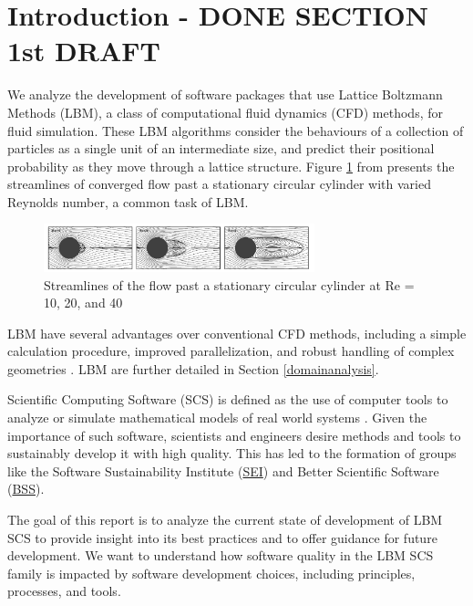 \documentclass[12pt, notitlepage]{article}
\begin{document}
\section{Introduction - DONE SECTION 1st DRAFT}

We analyze the development of software packages that use Lattice Boltzmann Methods (LBM), a class of computational fluid dynamics (CFD) methods, for fluid simulation. These LBM algorithms consider the behaviours of a collection of particles as a single unit of an intermediate size, and predict their positional probability as they move through a lattice structure. Figure \ref{circularflow} from \citep{chen2021phase} presents the streamlines of converged flow past a stationary circular cylinder with varied Reynolds number, a common task of LBM.

\begin{figure}[h!]
	\begin{center}
		\includegraphics[width=0.7\textwidth]{circularflow}
		\caption{Streamlines of the flow past a stationary circular cylinder at Re = 10, 20, and 40}
		\label{circularflow}
	\end{center}
\end{figure}

LBM have several advantages over conventional CFD methods, including a simple calculation procedure, improved parallelization, and robust handling of complex geometries \citep{ganji2015application}. LBM are further detailed in Section \ref{domainanalysis}. 

Scientific Computing Software (SCS) is defined as the use of computer tools to analyze or simulate mathematical models of real world systems \citep{smith2006systematic}. Given the importance of such software, scientists and engineers desire methods and tools to sustainably develop it with high quality. This has led to the formation of groups like the Software Sustainability Institute (\href{https://www.software.ac.uk/}{SEI}) and Better Scientific Software (\href{https://bssw.io/}{BSS}). 

The goal of this report is to analyze the current state of development of LBM SCS to provide insight into its best practices and to offer guidance for future development. We want to understand how software quality in the LBM SCS family is impacted by software development choices, including principles, processes, and tools.
\end{document}
